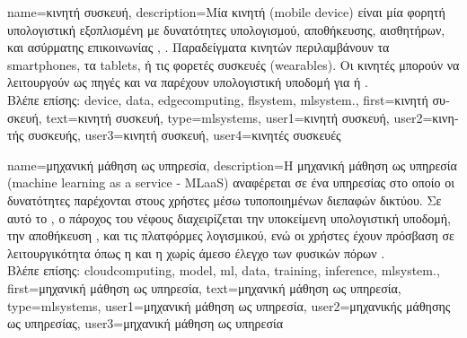 {name={\foreignlanguage{greek}{κινητή συσκευή}},
	description={\foreignlanguage{greek}{Μία κινητή}  (mobile device) 
		\foreignlanguage{greek}{είναι μία φορητή υπολογιστική}  \foreignlanguage{greek}{εξοπλισμένη με δυνατότητες υπολογισμού,
		αποθήκευσης, αισθητήρων, και ασύρματης επικοινωνίας} \cite{Lane2015}, \cite{Tsoukas2024}. 
		\foreignlanguage{greek}{Παραδείγματα κινητών}  \foreignlanguage{greek}{περιλαμβάνουν τα} smartphones, 
		\foreignlanguage{greek}{τα} tablets, \foreignlanguage{greek}{ή τις φορετές συσκευές} (wearables). \foreignlanguage{greek}{Οι κινητές}
		 \foreignlanguage{greek}{μπορούν να λειτουργούν ως πηγές}  \foreignlanguage{greek}{και 
		να παρέχουν υπολογιστική υποδομή για}  \foreignlanguage{greek}{ή} .
		\\
		\foreignlanguage{greek}{Βλέπε επίσης:} \gls{device}, \gls{data}, \gls{edgecomputing}, \gls{flsystem}, \gls{mlsystem}.},
	first={\foreignlanguage{greek}{κινητή συσκευή}},
	text={\foreignlanguage{greek}{κινητή συσκευή}},
	type=mlsystems,
	user1={\foreignlanguage{greek}{κινητή συσκευή}}, %
	user2={\foreignlanguage{greek}{κινητής συσκευής}}, %
	user3={\foreignlanguage{greek}{κινητή συσκευή}}, %
	user4={\foreignlanguage{greek}{κινητές συσκευές}} %
}

{name={\foreignlanguage{greek}{μηχανική μάθηση ως υπηρεσία}},
	description={\foreignlanguage{greek}{Η μηχανική μάθηση ως 
		υπηρεσία} 
		(machine learning as a service - MLaaS) \foreignlanguage{greek}{αναφέρεται σε ένα}
		 \foreignlanguage{greek}{υπηρεσίας}   
		\foreignlanguage{greek}{στο οποίο οι δυνατότητες}  
		\foreignlanguage{greek}{παρέχονται στους χρήστες μέσω τυποποιημένων διεπαφών δικτύου.}
		\foreignlanguage{greek}{Σε αυτό το} , \foreignlanguage{greek}{ο πάροχος 
		του νέφους διαχειρίζεται την υποκείμενη υπολογιστική υποδομή, την αποθήκευση}
		, \foreignlanguage{greek}{και τις πλατφόρμες λογισμικού, ενώ οι χρήστες 
		έχουν πρόσβαση σε λειτουργικότητα όπως η}   
		\foreignlanguage{greek}{και η}  \foreignlanguage{greek}{χωρίς άμεσο 
		έλεγχο των φυσικών πόρων} \cite{ComerCloudComputing2021}.
				 \\
		\foreignlanguage{greek}{Βλέπε επίσης:} \gls{cloudcomputing}, \gls{model}, \gls{ml}, \gls{data}, \gls{training}, 
		\gls{inference}, \gls{mlsystem}.},
	first={\foreignlanguage{greek}{μηχανική μάθηση ως υπηρεσία}},
	text={\foreignlanguage{greek}{μηχανική μάθηση ως υπηρεσία}},
	type=mlsystems,
	user1={\foreignlanguage{greek}{μηχανική μάθηση ως υπηρεσία}}, %
	user2={\foreignlanguage{greek}{μηχανικής μάθησης ως υπηρεσίας}}, %
	user3={\foreignlanguage{greek}{μηχανική μάθηση ως υπηρεσία}} %
}%


